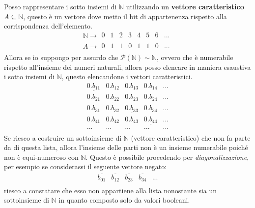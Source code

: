 \documentclass{article}
\begin{document}
Posso rappresentare i sotto insiemi di $\mathbb{N}$ utilizzando un \textbf{vettore caratteristico}
$A\subseteq\mathbb{N}$, questo è un vettore dove metto il bit di appartenenza rispetto alla corrispondenza
dell'elemento.
\[
    \mathbb{N}\rightarrow
    \begin{array}{cccccccc}
        0 & 1 & 2 & 3 & 4 & 5 & 6 & ... \\
    \end{array}
\]
\[
    A\rightarrow
    \begin{array}{cccccccc}
        0 & 1 & 1 & 0 & 1 & 1 & 0 & ... \\
    \end{array}
\]
Allora se io suppongo per assurdo che $\mathcal{P}(\mathbb{N})\sim\mathbb{N}$, ovvero che è numerabile
rispetto all'insieme dei numeri naturali, allora posso elencare in maniera esaustiva i sotto insiemi
di $\mathbb{N}$, questo elencandone i vettori caratteristici.
\[
    \begin{array}{ccccc}
        \underline{0.b_{11}} & 0.b_{12}             & 0.b_{13}             & 0.b_{14}             & ... \\
        0.b_{21}             & \underline{0.b_{22}} & 0.b_{23}             & 0.b_{24}             & ... \\
        0.b_{31}             & 0.b_{32}             & \underline{0.b_{33}} & 0.b_{34}             & ... \\
        0.b_{41}             & 0.b_{42}             & 0.b_{43}             & \underline{0.b_{44}} & ... \\
        ...                  & ...                  & ...                  & ...                  & ... \\
    \end{array}
\]
Se riesco a costruire un sottoinsieme di $\mathbb{N}$ (vettore caratteristico) che non fa parte da di questa lista,
allora l'insieme delle parti non è un insieme numerabile poiché non è equi-numeroso con $\mathbb{N}$. Questo
è possibile procedendo per \textit{diagonalizzazione}, per esempio se considerassi il seguente vettore negato:
\[
    \begin{array}{ccccc}
        \overline{b_{01}} & \overline{b_{12}} & \overline{b_{23}} & \overline{b_{34}} & ... \\
    \end{array}
\]
riesco a constatare che esso non appartiene alla lista nonostante sia un sottoinsieme di $\mathbb{N}$
in quanto composto solo da valori booleani.
\end{document}
